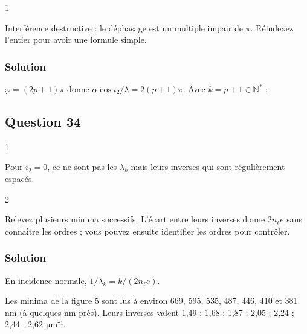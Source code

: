 \documentclass[11pt,a4paper]{article}
\newcommand{\equationajustee}[1]{%
  \sbox{\boiteequation}{$\displaystyle #1$}%
  \ifdim\wd\boiteequation>\linewidth
    \[\resizebox{\linewidth}{!}{\usebox{\boiteequation}}\]%
  \else
    \[#1\]%
  \fi}
\begin{document}
\begin{indication}{1}

Interférence destructive : le déphasage est un multiple impair de \(\pi\). Réindexez l'entier pour avoir une formule simple.

\end{indication}

\hypertarget{solution-32}{%
\subsubsection{Solution}\label{solution-32}}

\(\varphi=(2p+1)\pi\) donne \(\alpha\cos i_2/\lambda=2(p+1)\pi\). Avec \(k=p+1\in\mathbb N^*\) :

\equationajustee{\boxed{\begin{aligned}
\lambda_k&=\frac{\alpha\cos i_2}{2\pi k}\\
&=\frac{2n_\ell e\cos i_2}k,\quad k\in\mathbb N^*
\end{aligned}}}

\hypertarget{question-34}{%
\subsection{Question 34}\label{question-34}}

\begin{indication}{1}

Pour \(i_2=0\), ce ne sont pas les \(\lambda_k\) mais leurs inverses qui sont régulièrement espacés.

\end{indication}

\begin{indication}{2}

Relevez plusieurs minima successifs. L'écart entre leurs inverses donne \(2n_\ell e\) sans connaître les ordres ; vous pouvez ensuite identifier les ordres pour contrôler.

\end{indication}

\hypertarget{solution-33}{%
\subsubsection{Solution}\label{solution-33}}

En incidence normale, \(1/\lambda_k=k/(2n_\ell e)\).

Les minima de la figure 5 sont lus à environ 669, 595, 535, 487, 446, 410 et 381 nm (à quelques nm près). Leurs inverses valent 1,49 ; 1,68 ; 1,87 ; 2,05 ; 2,24 ; 2,44 ; 2,62 µm⁻¹.
\end{document}
